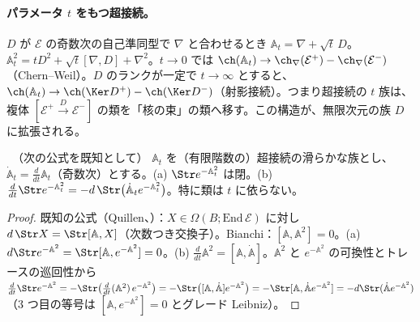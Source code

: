 \paragraph{パラメータ $t$ をもつ超接続。}$D$ が $\mathcal E$ の奇数次の自己準同型で $\nabla$ と合わせるとき $\mathbb A_t=\nabla+\sqrt t\,D$。$\mathbb A_t^2=tD^2+\sqrt t[\nabla,D]+\nabla^2$。$t\to0$ では $\ch(\mathbb A_t)\to\ch_\nabla(\mathcal E^+)-\ch_\nabla(\mathcal E^-)$（Chern--Weil）。$D$ のランクが一定で $t\to\infty$ とすると、$\ch(\mathbb A_t)\to\ch(\Ker D^+)-\ch(\Ker D^-)$（射影接続）。つまり超接続の $t$ 族は、複体 $[\mathcal E^+\xrightarrow D\mathcal E^-]$ の類を「核の束」の類へ移す。この構造が、無限次元の族 $D$ に拡張される。
\begin{prop}\label{prop:CS}\tP\ （次の公式を既知として）
$\mathbb A_t$ を（有限階数の）超接続の滑らかな族とし、$\dot{\mathbb A}_t=\frac d{dt}\mathbb A_t$（奇数次）とする。(a) $\Str e^{-\mathbb A_t^2}$ は閉。(b) $\frac d{dt}\Str e^{-\mathbb A_t^2}=-d\,\Str\bigl(\dot{\mathbb A}_te^{-\mathbb A_t^2}\bigr)$。特に類は $t$ に依らない。
\end{prop}
\begin{proof}
既知の公式（Quillen、\tC）：$X\in\Omega(B;\mathrm{End}\,\mathcal E)$ に対し $d\,\Str X=\Str[\mathbb A,X]$（次数つき交換子）。Bianchi：$[\mathbb A,\mathbb A^2]=0$。(a) $d\Str e^{-\mathbb A^2}=\Str[\mathbb A,e^{-\mathbb A^2}]=0$。(b) $\frac d{dt}\mathbb A^2=[\mathbb A,\dot{\mathbb A}]$。$\mathbb A^2$ と $e^{-\mathbb A^2}$ の可換性とトレースの巡回性から $\frac d{dt}\Str e^{-\mathbb A^2}=-\Str\bigl(\tfrac d{dt}(\mathbb A^2)\,e^{-\mathbb A^2}\bigr)=-\Str\bigl([\mathbb A,\dot{\mathbb A}]e^{-\mathbb A^2}\bigr)=-\Str[\mathbb A,\dot{\mathbb A}e^{-\mathbb A^2}]=-d\Str(\dot{\mathbb A}e^{-\mathbb A^2})$（3 つ目の等号は $[\mathbb A,e^{-\mathbb A^2}]=0$ とグレード Leibniz）。\qedhere
\end{proof}
